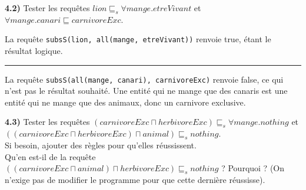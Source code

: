 \documentclass[a4paper,12pt]{report}
\begin{document}
\textbf{4.2)} Tester les requêtes \(lion \sqsubseteq_s \forall mange.etreVivant\) et \(\forall mange.canari \sqsubseteq carnivoreExc\).



\begin{tcolorbox}[colback=gray!10, colframe=blue!30, coltitle=black, title=Réponse à la question 4.2 - 1/1]

    La requête \texttt{subsS(lion, all(mange, etreVivant))} renvoie true, étant le résultat logique.

    \vspace{0.5cm}
    \hrule
    \vspace{0.5cm}

    La requête \texttt{subsS(all(mange, canari), carnivoreExc)} renvoie false, ce qui n'est pas le résultat souhaité. Une entité qui ne mange que des canaris est une 
        entité qui ne mange que des animaux, donc un carnivore exclusive.

\end{tcolorbox}




\newpage

{}

\textbf{4.3)} Tester les requêtes \((carnivoreExc \sqcap herbivoreExc) \sqsubseteq_s \forall mange.nothing\) et 
    \(((carnivoreExc \sqcap herbivoreExc) \sqcap animal) \sqsubseteq_s nothing \).\\
    Si besoin, ajouter des règles pour qu'elles réussissent.\\
    Qu'en est-il de la requête \(((carnivoreExc \sqcap animal) \sqcap herbivoreExc) \sqsubseteq_s nothing\) ? Pourquoi ? (On n'exige pas de modifier le programme pour
    que cette dernière réussisse).
\end{document}
